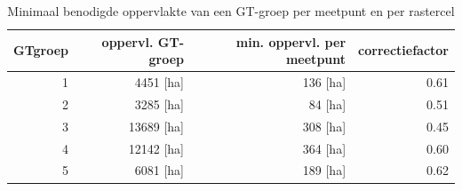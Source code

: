 \documentclass[11pt,]{book}
\begin{document}
\begin{table}

\caption{\label{tab:gemiddelde-oppervlakte-per-GTgroep}Minimaal benodigde oppervlakte van een GT-groep per meetpunt en per rastercel}
\centering
\begin{tabular}[t]{r|r|r|r}
\hline
GTgroep & oppervl. GT-groep & min. oppervl. per meetpunt & correctiefactor\\
\hline
1 & 4451 [ha] & 136 [ha] & 0.61\\
\hline
2 & 3285 [ha] & 84 [ha] & 0.51\\
\hline
3 & 13689 [ha] & 308 [ha] & 0.45\\
\hline
4 & 12142 [ha] & 364 [ha] & 0.60\\
\hline
5 & 6081 [ha] & 189 [ha] & 0.62\\
\hline
\end{tabular}
\end{table}
\end{document}
